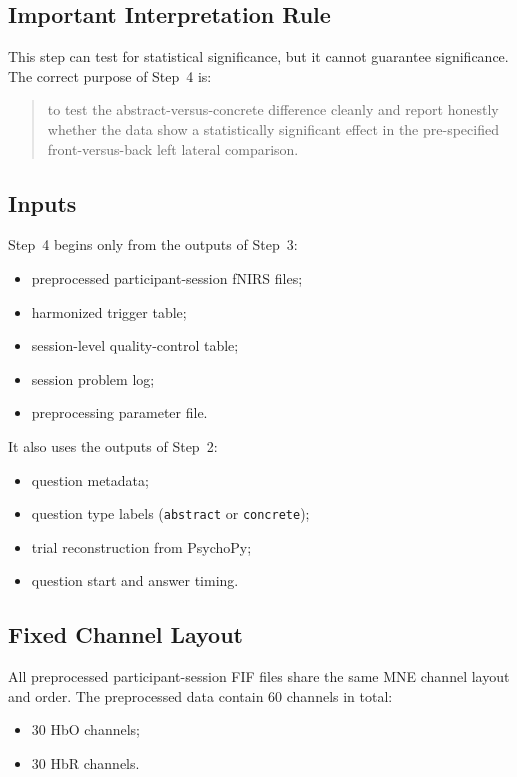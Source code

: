 \documentclass[11pt]{article}
\begin{document}
\subsection{Important Interpretation Rule}
This step can test for statistical significance, but it cannot guarantee significance.
The correct purpose of Step~4 is:
\begin{quote}
to test the abstract-versus-concrete difference cleanly and report honestly whether the data show
a statistically significant effect in the pre-specified front-versus-back left lateral comparison.
\end{quote}

\subsection{Inputs}
Step~4 begins only from the outputs of Step~3:
\begin{itemize}
    \item preprocessed participant-session fNIRS files;
    \item harmonized trigger table;
    \item session-level quality-control table;
    \item session problem log;
    \item preprocessing parameter file.
\end{itemize}

It also uses the outputs of Step~2:
\begin{itemize}
    \item question metadata;
    \item question type labels (\texttt{abstract} or \texttt{concrete});
    \item trial reconstruction from PsychoPy;
    \item question start and answer timing.
\end{itemize}

\subsection{Fixed Channel Layout}
All preprocessed participant-session FIF files share the same MNE channel layout and order.
The preprocessed data contain 60 channels in total:
\begin{itemize}
    \item 30 HbO channels;
    \item 30 HbR channels.
\end{itemize}
\end{document}
